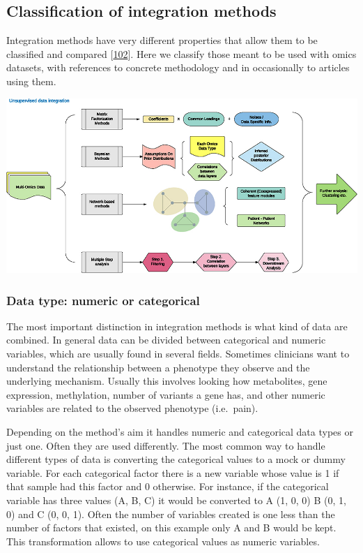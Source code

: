 \documentclass[
  12pt,
  a4paper,
  twoside,
  openright]{book}
\let\origfigure\figure
\let\endorigfigure\endfigure
\renewenvironment{figure}[1][2] {
    \expandafter\origfigure\expandafter[!htp]
} {
    \endorigfigure
}
\begin{document}
\hypertarget{classification-of-integration-methods}{%
\subsection{Classification of integration methods}\label{classification-of-integration-methods}}

Integration methods have very different properties that allow them to be classified and compared {[}\protect\hyperlink{ref-huang2017}{102}{]}.
Here we classify those meant to be used with omics datasets, with references to concrete methodology and in occasionally to articles using them.

\begin{figure}
\includegraphics[width=1\linewidth]{images/figure1_huang2017} \caption[Unsupervised data integration methodology.]{Unsupervised data integration methodology. Figure 1 from Huang 2017.}\label{fig:classification}
\end{figure}

\hypertarget{data-type-numeric-or-categorical}{%
\subsubsection{Data type: numeric or categorical}\label{data-type-numeric-or-categorical}}

The most important distinction in integration methods is what kind of data are combined.
In general data can be divided between categorical and numeric variables, which are usually found in several fields.
Sometimes clinicians want to understand the relationship between a phenotype they observe and the underlying mechanism.
Usually this involves looking how metabolites, gene expression, methylation, number of variants a gene has, and other numeric variables are related to the observed phenotype (i.e.~pain).

Depending on the method's aim it handles numeric and categorical data types or just one.
Often they are used differently.
The most common way to handle different types of data is converting the categorical values to a mock or dummy variable.
For each categorical factor there is a new variable whose value is 1 if that sample had this factor and 0 otherwise.
For instance, if the categorical variable has three values (A, B, C) it would be converted to A (1, 0, 0) B (0, 1, 0) and C (0, 0, 1).
Often the number of variables created is one less than the number of factors that existed, on this example only A and B would be kept.
This transformation allows to use categorical values as numeric variables.
\end{document}
